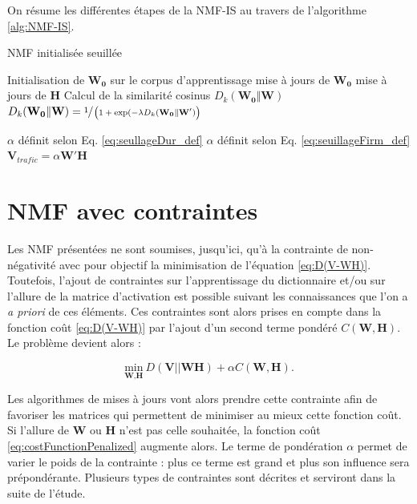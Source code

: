 On résume les différentes étapes de la NMF-IS au travers de l'algorithme \ref{alg:NMF-IS}.

\begin{algorithm}
\caption{NMF initialisée seuillée}
\begin{algorithmic} 
\STATE Initialisation de $\mathbf{W_0}$ sur le corpus d'apprentissage
	\STATE mise à jours de $\mathbf{W_0}$
	\STATE mise à jours de $\mathbf{H}$
\ENDFOR
\STATE Calcul de la similarité cosinus $D_{k}(\mathbf{W_0} \Vert \mathbf{W})$
	\STATE $D_{k}(\mathbf{W_0} \Vert \mathbf{W}) = \sfrac{1}{\left(1+\exp({-\lambda D_{k}(\mathbf{W_0} \Vert \mathbf{W'})}\right)}$
\ENDIF

	\STATE $\alpha$ définit selon Eq. \ref{eq:seullageDur_def}
	\STATE $\alpha$ définit selon Eq. \ref{eq:seuillageFirm_def}
\ENDIF
\STATE $\mathbf{V}_{trafic} = \alpha \mathbf{W'H}$
\end{algorithmic}
\label{alg:NMF-IS}
\end{algorithm}


\section{NMF avec contraintes}\label{part:NMF_contrainte}
Les NMF présentées ne sont soumises, jusqu'ici, qu'à la contrainte de non-négativité avec pour objectif la minimisation de l'équation \ref{eq:D(V-WH)}. Toutefois, l'ajout de contraintes sur l'apprentissage du dictionnaire et/ou sur l'allure de la matrice d'activation est possible suivant les connaissances que l'on a \textit{a priori} de ces éléments. Ces contraintes sont alors prises en compte dans la fonction coût \ref{eq:D(V-WH)} par l'ajout d'un second terme pondéré $C(\mathbf{W},\mathbf{H})$. Le problème devient alors : 

\begin{equation}\label{eq:costFunctionPenalized}
\underset{\textbf{W},\textbf{H}}{\text{min}}~D\left(\textbf{V} \vert\vert \textbf{WH}\right) + \alpha C(\mathbf{W},\mathbf{H}).
\end{equation}

Les algorithmes de mises à jours vont alors prendre cette contrainte afin de favoriser les matrices qui permettent de minimiser au mieux cette fonction coût. Si l'allure de $\mathbf{W}$ ou $\mathbf{H}$ n'est pas celle souhaitée, la fonction coût \ref{eq:costFunctionPenalized} augmente alors. Le terme de pondération $\alpha$ permet de varier le poids de la contrainte : plus ce terme est grand et plus son influence sera prépondérante. Plusieurs types de contraintes sont décrites et serviront dans la suite de l'étude. 

